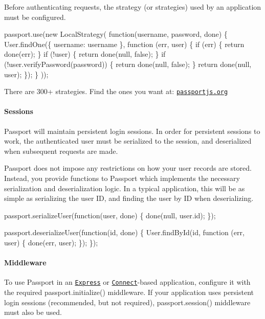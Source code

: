 Before authenticating requests, the strategy (or strategies) used by an application must be configured.


\begin{DoxyCode}
passport.use(new LocalStrategy(
  function(username, password, done) \{
    User.findOne(\{ username: username \}, function (err, user) \{
      if (err) \{ return done(err); \}
      if (!user) \{ return done(null, false); \}
      if (!user.verifyPassword(password)) \{ return done(null, false); \}
      return done(null, user);
    \});
  \}
));
\end{DoxyCode}


There are 300+ strategies. Find the ones you want at\+: \href{http://passportjs.org}{\tt passportjs.\+org}

\paragraph*{Sessions}

Passport will maintain persistent login sessions. In order for persistent sessions to work, the authenticated user must be serialized to the session, and deserialized when subsequent requests are made.

Passport does not impose any restrictions on how your user records are stored. Instead, you provide functions to Passport which implements the necessary serialization and deserialization logic. In a typical application, this will be as simple as serializing the user ID, and finding the user by ID when deserializing.


\begin{DoxyCode}
passport.serializeUser(function(user, done) \{
  done(null, user.id);
\});

passport.deserializeUser(function(id, done) \{
  User.findById(id, function (err, user) \{
    done(err, user);
  \});
\});
\end{DoxyCode}


\paragraph*{Middleware}

To use Passport in an \href{http://expressjs.com/}{\tt Express} or \href{http://senchalabs.github.com/connect/}{\tt Connect}-\/based application, configure it with the required {\ttfamily passport.\+initialize()} middleware. If your application uses persistent login sessions (recommended, but not required), {\ttfamily passport.\+session()} middleware must also be used.


